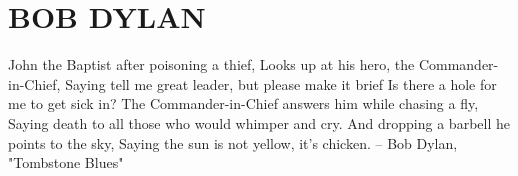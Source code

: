 \chapter{\texorpdfstring{BOB DYLAN}{}} %
\setcounter{equation}{0}  

John the Baptist after poisoning a thief,
Looks up at his hero, the Commander-in-Chief,
Saying tell me great leader, but please make it brief
Is there a hole for me to get sick in?
 The Commander-in-Chief answers him while chasing a fly,
Saying death to all those who would whimper and cry.
And dropping a barbell he points to the sky,
Saying the sun is not yellow, it's chicken.
		-- Bob Dylan, "Tombstone Blues"

